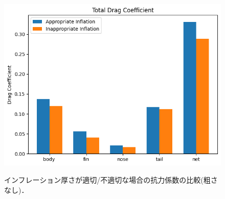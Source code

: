 \documentclass[uplatex,dvipdfmx,a4j,12pt]{jsarticle}
\begin{document}
\begin{figure}[H]
\begin{minipage}{0.45\linewidth}
      \centering
      \includegraphics[width=\linewidth]{wall_function/img/4_2_2_total_drag.png}
      \label{fig:4_2_2_cd_total}
  \end{minipage}
  \caption{インフレーション厚さが適切/不適切な場合の抗力係数の比較(粗さなし)．}
  \label{fig:4_2_cd_wo_rough}
\end{figure}
\end{document}
